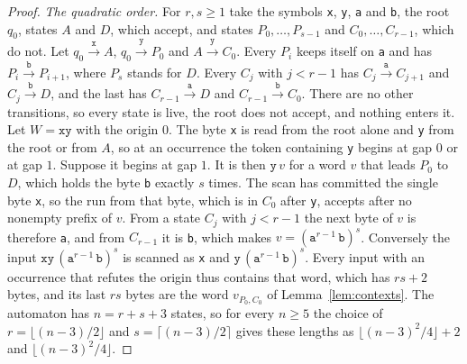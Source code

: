 \documentclass[11pt,a4paper]{article}
\theoremstyle{definition}
\theoremstyle{plain}
\newcommand{\code}[1]{\texttt{#1}}
\begin{document}
\begin{proof}
\emph{The quadratic order.} For $r, s \geq 1$ take the symbols \code{x}, \code{y}, \code{a} and \code{b}, the root
$q_0$, states $A$ and $D$, which accept, and states $P_0, \ldots, P_{s-1}$ and $C_0, \ldots, C_{r-1}$, which do not. Let
$q_0 \xrightarrow{\code{x}} A$, $q_0 \xrightarrow{\code{y}} P_0$ and $A \xrightarrow{\code{y}} C_0$. Every $P_i$ keeps
itself on \code{a} and has $P_i \xrightarrow{\code{b}} P_{i+1}$, where $P_s$ stands for $D$. Every $C_j$ with
$j < r - 1$ has $C_j \xrightarrow{\code{a}} C_{j+1}$ and $C_j \xrightarrow{\code{b}} D$, and the last has
$C_{r-1} \xrightarrow{\code{a}} D$ and $C_{r-1} \xrightarrow{\code{b}} C_0$. There are no other transitions, so every
state is live, the root does not accept, and nothing enters it. Let $W = \code{xy}$ with the origin $0$. The byte
\code{x} is read from the root alone and \code{y} from the root or from $A$, so at an occurrence the token containing
\code{y} begins at gap $0$ or at gap $1$. Suppose it begins at gap $1$. It is then $\code{y}\, v$ for a word $v$ that
leads $P_0$ to $D$, which holds the byte \code{b} exactly $s$ times. The scan has committed the single byte \code{x}, so
the run from that byte, which is in $C_0$ after \code{y}, accepts after no nonempty prefix of $v$. From a state $C_j$
with $j < r - 1$ the next byte of $v$ is therefore \code{a}, and from $C_{r-1}$ it is \code{b}, which makes
$v = (\code{a}^{r-1}\, \code{b})^s$. Conversely the input $\code{xy}\, (\code{a}^{r-1}\, \code{b})^s$ is scanned as
\code{x} and $\code{y}\, (\code{a}^{r-1}\, \code{b})^s$. Every input with an occurrence that refutes the origin thus
contains that word, which has $r s + 2$ bytes, and its last $r s$ bytes are the word $v_{P_0, C_0}$ of
Lemma~\ref{lem:contexts}. The automaton has $n = r + s + 3$ states, so for every $n \geq 5$ the choice of
$r = \lfloor (n - 3) / 2 \rfloor$ and $s = \lceil (n - 3) / 2 \rceil$ gives these lengths as
$\lfloor (n - 3)^2 / 4 \rfloor + 2$ and $\lfloor (n - 3)^2 / 4 \rfloor$.


\end{proof}
\end{document}
